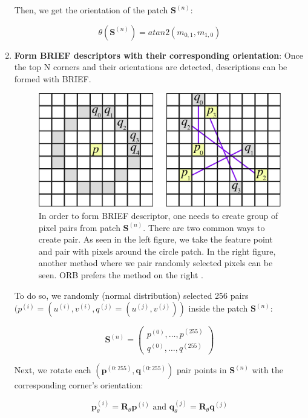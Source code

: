 \documentclass[a4paper]{report}
\numberwithin{figure}{section}
\begin{document}
\begin{enumerate}
	Then, we get the orientation of the patch $\mathbf{S}^{(n)}$:
	
	\begin{equation}
	\theta(\mathbf{S}^{(n)}) = atan2(m_{0,1}, m_{1,0})
	\end{equation}
	
	\item \textbf{Form BRIEF descriptors with their corresponding 
		orientation}: Once the top N corners and their orientations are 
		detected, 
	descriptions can be formed with BRIEF. 
	
	\begin{figure}[H]
		\centering
		\includegraphics[width=0.6\linewidth,natwidth=640,natheight=640]
		{fig/ref_imgs/brief.png}
		\caption[BRIEF Descriptor]{In order to form BRIEF descriptor, one 
		needs 
			to create group of pixel pairs from patch $\mathbf{S}^{(n)}$. 
			There are 
			two common ways to create pair. As seen in the left figure, we 
			take the 
			feature point and pair with pixels around the circle patch. In the 
			right 
			figure, another method where we pair randomly selected pixels can 
			be 
			seen. ORB prefers the method on the right \parencite{Klette2014}.}
		\label{fig:brief}
	\end{figure}
	
	
	To do so, we randomly (normal distribution) selected 256 pairs 
	$(p^{(i)}=(u^{(i)},v^{(i)},q^{(j)}=(u^{(j)},v^{(j)}))$ inside the patch 
	$\mathbf{S}^{(n)}$:
	
	\begin{equation}
	\mathbf{S}^{(n)} = 
	\begin{pmatrix}
	p^{(0)}, \dots, p^{(255)}\\
	q^{(0)}, \dots, q^{(255)}
	\end{pmatrix}
	\end{equation}
	
	Next, we rotate each $(\mathbf{p}^{(0:255)}, \mathbf{q}^{(0:255)})$ pair 
	points in $\mathbf{S}^{(n)}$ with the corresponding corner's orientation:
	
	\begin{equation}
	\mathbf{p}^{(i)}_{\theta} = \mathbf{R}_{\theta}\mathbf{p}^{(i)} \text{ and 
	} 
	\mathbf{q}^{(j)}_{\theta} = \mathbf{R}_{\theta}\mathbf{q}^{(j)}
	\end{equation}
	

\end{enumerate}
\end{document}
